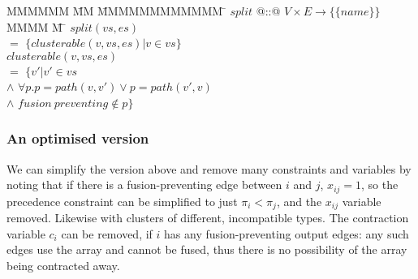 \begin{tabbing}
MMMMMM      \= MM   \=  MMMMMMMMMMMM    \=  \kill
$split$     \> @::@ \> $V \times E \to \{ \{name\} \}$      \\
MMMM        \= M    \= \kill
$split(vs,es)$ \\
    \> $=$  \> $\{clusterable(v,vs,es) | v \in vs\}$      \\
$clusterable(v,vs,es)$  \\
    \>$=$       \>$\{v' | v' \in vs$                                \\
    \>$\wedge$  \>$\forall p. p = path(v,v') \vee p = path(v',v)$   \\
    \>$\wedge$  \>$fusion~preventing \not\in p\}$\\
\end{tabbing}

\subsubsection{An optimised version}
We can simplify the version above and remove many constraints and variables by noting that if there is a fusion-preventing edge between $i$ and $j$, $x_{ij} = 1$, so the precedence constraint can be simplified to just $\pi_i < \pi_j$, and the $x_{ij}$ variable removed.
Likewise with clusters of different, incompatible types.
The contraction variable $c_i$ can be removed, if $i$ has any fusion-preventing output edges: any such edges use the array and cannot be fused, thus there is no possibility of the array being contracted away.


